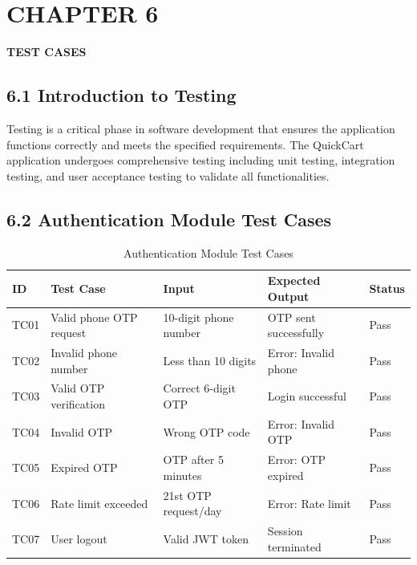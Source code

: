 \documentclass[12pt,a4paper]{report}
\begin{document}
\chapter*{CHAPTER 6}

\begin{center}
    \textbf{\large TEST CASES}
\end{center}

\section*{6.1 Introduction to Testing}

Testing is a critical phase in software development that ensures the application functions correctly and meets the specified requirements. The QuickCart application undergoes comprehensive testing including unit testing, integration testing, and user acceptance testing to validate all functionalities.

\section*{6.2 Authentication Module Test Cases}

\begin{table}[H]
\centering
\small
\begin{tabular}{|p{0.8cm}|p{2.8cm}|p{3.8cm}|p{3cm}|p{1.2cm}|}
\hline
\textbf{ID} & \textbf{Test Case} & \textbf{Input} & \textbf{Expected Output} & \textbf{Status} \\
\hline
TC01 & Valid phone OTP request & 10-digit phone number & OTP sent successfully & Pass \\
\hline
TC02 & Invalid phone number & Less than 10 digits & Error: Invalid phone & Pass \\
\hline
TC03 & Valid OTP verification & Correct 6-digit OTP & Login successful & Pass \\
\hline
TC04 & Invalid OTP & Wrong OTP code & Error: Invalid OTP & Pass \\
\hline
TC05 & Expired OTP & OTP after 5 minutes & Error: OTP expired & Pass \\
\hline
TC06 & Rate limit exceeded & 21st OTP request/day & Error: Rate limit & Pass \\
\hline
TC07 & User logout & Valid JWT token & Session terminated & Pass \\
\hline
\end{tabular}
\caption{Authentication Module Test Cases}
\end{table}
\end{document}
